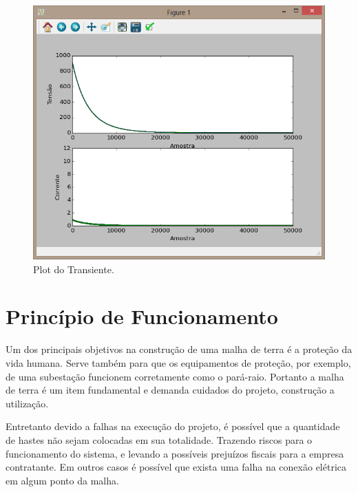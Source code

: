 \documentclass[a4paper, 10pt]{article}
\begin{document}
\begin{figure}[H]
        \caption{\label{fig_plt_transiente}Plot do Transiente.}
	    \begin{center}
            \includegraphics[scale=0.4]{../fotos/execucao/plot_transiente.png}
	    \end{center}
\end{figure}




\section{Princípio de Funcionamento}

Um dos principais objetivos na construção de uma malha de terra é a 
proteção da vida humana. Serve também para que os equipamentos de 
proteção, por exemplo, de uma subestação funcionem corretamente como
o pará-raio. Portanto a malha de terra é um item fundamental e 
demanda cuidados do projeto, construção a utilização.

Entretanto devido a falhas na execução do projeto, é possível que a quantidade
de hastes não sejam colocadas em sua totalidade. Trazendo riscos para o 
funcionamento do sistema, e levando a possíveis prejuízos fiscais para a 
empresa contratante. Em outros casos é possível que exista uma falha na 
conexão elétrica em algum ponto da malha.
\end{document}
